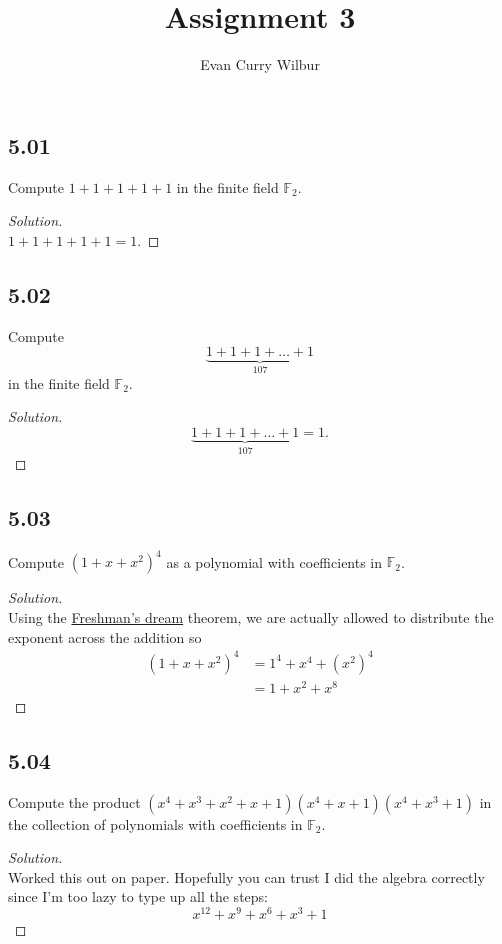\documentclass[]{article}
\title{Assignment 3}
\author{Evan Curry Wilbur}
\newcommand\<{\langle}
\renewcommand\>{\rangle}
\newcommand{\FF}{\ensuremath{\mathbb{F}}}
\newenvironment{solution}
{
	\begin{proof}[Solution] \text{ }
		\\
	}
	{
	\end{proof}
}
\begin{document}
\maketitle

\subsection*{5.01} Compute $1 + 1 + 1 + 1 + 1$ in the finite field $\FF_2$.
\begin{solution}
	$1 + 1 + 1 + 1 + 1 = 1$.
\end{solution}

\subsection*{5.02} Compute
$$
	\underbrace{1 + 1 + 1 + \dots + 1}_\text{107}
$$
in the finite field $\FF_2$.
\begin{solution}
	$$
		\underbrace{1 + 1 + 1 + \dots + 1}_\text{107} = 1.
	$$
\end{solution}

\subsection*{5.03} Compute $\left(1 + x + x^2\right)^4$ as a polynomial with coefficients in $\FF_2$.
\begin{solution}
	Using the \href{https://planetmath.org/freshmansdream}{Freshman's dream} theorem, we are actually allowed to distribute the exponent across the addition so
\begin{align*}
	\left(1 + x + x^2\right)^4 &= 1^4 + x^4 + \left(x^2\right)^4 \\
	&= 1 + x^2 + x^8 
\end{align*}
\end{solution}

\subsection*{5.04} Compute the product $\left(x^4 + x^3 + x^2 + x + 1\right)\left(x^4 + x + 1\right)\left(x^4 + x^3 + 1\right)$ in the collection of polynomials with coefficients in $\FF_2$.
\begin{solution}
	Worked this out on paper. Hopefully you can trust I did the algebra correctly since I'm too lazy to type up all the steps:
	$$
		x^{12}+x^9+x^6+x^3+1
	$$
\end{solution}
\end{document}
